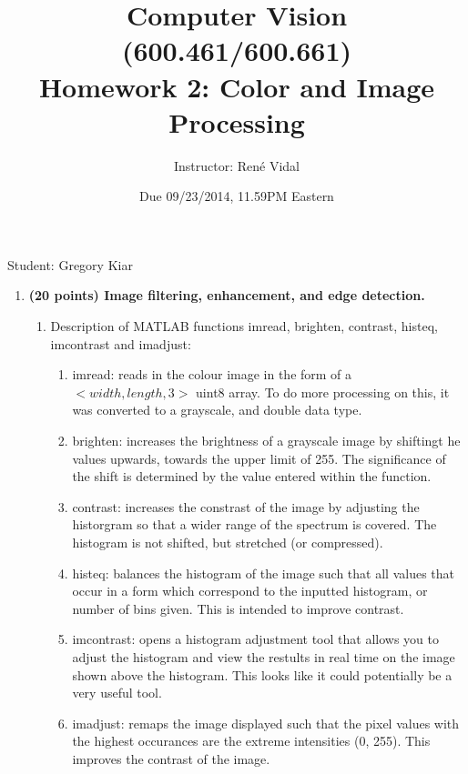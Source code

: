 \documentclass[10pt]{article}
\begin{document}
\title{
\vspace{-19mm}
Computer Vision (600.461/600.661)\\
Homework 2: Color and Image Processing}
\author{Instructor: Ren\'e Vidal}
\date{Due 09/23/2014, 11.59PM Eastern}

\maketitle

Student: Gregory Kiar
\begin{enumerate}

\item \textbf{(20 points) Image filtering, enhancement, and edge detection.} 
%
\begin{enumerate}
\item Description of MATLAB functions imread, brighten, contrast, histeq, imcontrast and imadjust:
%
\begin{enumerate}
\item imread: reads in the colour image in the form of a $<width , length , 3>$ uint8 array. To do more processing on this, it was converted to a grayscale, and double data type. 
\item brighten: increases the brightness of a grayscale image by shiftingt he values upwards, towards the upper limit of 255. The significance of the shift is determined by the value 
entered within the function.
\item contrast: increases the constrast of the image by adjusting the historgram so that a wider range of the spectrum is covered. The histogram is not shifted, but stretched (or compressed).
\item histeq: balances the histogram of the image such that all values that occur in a form which correspond to the inputted histogram, or number of bins given. This is intended to improve contrast.
\item imcontrast: opens a histogram adjustment tool that allows you to adjust the histogram and view the restults in real time on the image shown above the histogram. This looks like it could potentially be a very useful tool.
\item imadjust: remaps the image displayed such that the pixel values with the highest occurances are the extreme intensities (0, 255). This improves the contrast of the image.
\end{enumerate}


\end{enumerate}
\end{enumerate}
\end{document}
